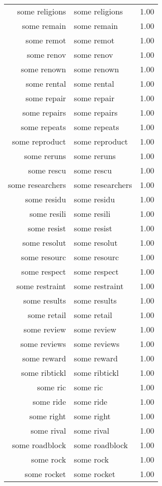 \begin{table}[ht]
\begin{tabular}{rlr}
  some religions & some religions & 1.00 \\ 
  some remain & some remain & 1.00 \\ 
  some remot & some remot & 1.00 \\ 
  some renov & some renov & 1.00 \\ 
  some renown & some renown & 1.00 \\ 
  some rental & some rental & 1.00 \\ 
  some repair & some repair & 1.00 \\ 
  some repairs & some repairs & 1.00 \\ 
  some repeats & some repeats & 1.00 \\ 
  some reproduct & some reproduct & 1.00 \\ 
  some reruns & some reruns & 1.00 \\ 
  some rescu & some rescu & 1.00 \\ 
  some researchers & some researchers & 1.00 \\ 
  some residu & some residu & 1.00 \\ 
  some resili & some resili & 1.00 \\ 
  some resist & some resist & 1.00 \\ 
  some resolut & some resolut & 1.00 \\ 
  some resourc & some resourc & 1.00 \\ 
  some respect & some respect & 1.00 \\ 
  some restraint & some restraint & 1.00 \\ 
  some results & some results & 1.00 \\ 
  some retail & some retail & 1.00 \\ 
  some review & some review & 1.00 \\ 
  some reviews & some reviews & 1.00 \\ 
  some reward & some reward & 1.00 \\ 
  some ribtickl & some ribtickl & 1.00 \\ 
  some ric & some ric & 1.00 \\ 
  some ride & some ride & 1.00 \\ 
  some right & some right & 1.00 \\ 
  some rival & some rival & 1.00 \\ 
  some roadblock & some roadblock & 1.00 \\ 
  some rock & some rock & 1.00 \\ 
  some rocket & some rocket & 1.00 \\ 

\end{tabular}
\end{table}
